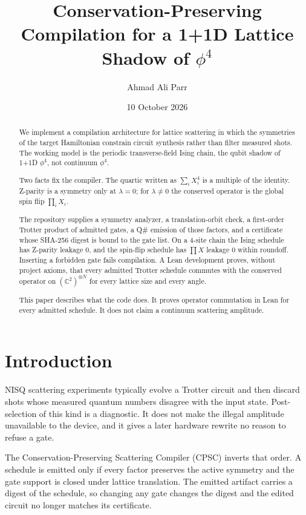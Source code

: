 \documentclass[11pt]{article}
\title{Conservation-Preserving Compilation for a 1+1D Lattice Shadow of $\phi^4$}
\author{Ahmad Ali Parr}
\date{10 October 2026}
\theoremstyle{definition}
\begin{document}
\maketitle

\begin{abstract}
\noindent
We implement a compilation architecture for lattice scattering in which the symmetries of the target Hamiltonian constrain circuit synthesis rather than filter measured shots. The working model is the periodic transverse-field Ising chain, the qubit shadow of 1+1D $\phi^4$, not continuum $\phi^4$.

Two facts fix the compiler. The quartic written as $\sum_i X_i^4$ is a multiple of the identity. Z-parity is a symmetry only at $\lambda = 0$; for $\lambda \neq 0$ the conserved operator is the global spin flip $\prod_i X_i$.

The repository supplies a symmetry analyzer, a translation-orbit check, a first-order Trotter product of admitted gates, a Q\# emission of those factors, and a certificate whose SHA-256 digest is bound to the gate list. On a 4-site chain the Ising schedule has Z-parity leakage 0, and the spin-flip schedule has $\prod X$ leakage 0 within roundoff. Inserting a forbidden gate fails compilation. A Lean development proves, without project axioms, that every admitted Trotter schedule commutes with the conserved operator on $(\mathbb{C}^2)^{\otimes N}$ for every lattice size and every angle.

This paper describes what the code does. It proves operator commutation in Lean for every admitted schedule. It does not claim a continuum scattering amplitude.
\end{abstract}

\section{Introduction}

NISQ scattering experiments typically evolve a Trotter circuit and then discard shots whose measured quantum numbers disagree with the input state. Post-selection of this kind is a diagnostic. It does not make the illegal amplitude unavailable to the device, and it gives a later hardware rewrite no reason to refuse a gate.

The Conservation-Preserving Scattering Compiler (CPSC) inverts that order. A schedule is emitted only if every factor preserves the active symmetry and the gate support is closed under lattice translation. The emitted artifact carries a digest of the schedule, so changing any gate changes the digest and the edited circuit no longer matches its certificate.
\end{document}
